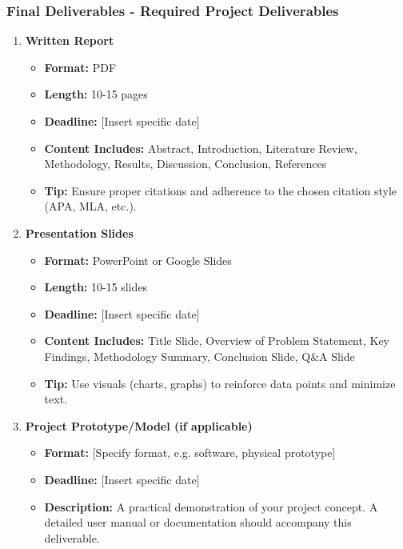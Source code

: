 \documentclass[aspectratio=169]{beamer}
\begin{document}
\begin{frame}[fragile]
    \frametitle{Final Deliverables - Required Project Deliverables}
    \begin{enumerate}
        \item \textbf{Written Report}
        \begin{itemize}
            \item \textbf{Format:} PDF
            \item \textbf{Length:} 10-15 pages
            \item \textbf{Deadline:} [Insert specific date]
            \item \textbf{Content Includes:} Abstract, Introduction, Literature Review, Methodology, Results, Discussion, Conclusion, References
            \item \textbf{Tip:} Ensure proper citations and adherence to the chosen citation style (APA, MLA, etc.).
        \end{itemize}

        \item \textbf{Presentation Slides}
        \begin{itemize}
            \item \textbf{Format:} PowerPoint or Google Slides
            \item \textbf{Length:} 10-15 slides
            \item \textbf{Deadline:} [Insert specific date]
            \item \textbf{Content Includes:} Title Slide, Overview of Problem Statement, Key Findings, Methodology Summary, Conclusion Slide, Q\&A Slide
            \item \textbf{Tip:} Use visuals (charts, graphs) to reinforce data points and minimize text.
        \end{itemize}

        \item \textbf{Project Prototype/Model (if applicable)}
        \begin{itemize}
            \item \textbf{Format:} [Specify format, e.g. software, physical prototype]
            \item \textbf{Deadline:} [Insert specific date]
            \item \textbf{Description:} A practical demonstration of your project concept. A detailed user manual or documentation should accompany this deliverable.
        \end{itemize}
    \end{enumerate}
\end{frame}
\end{document}
